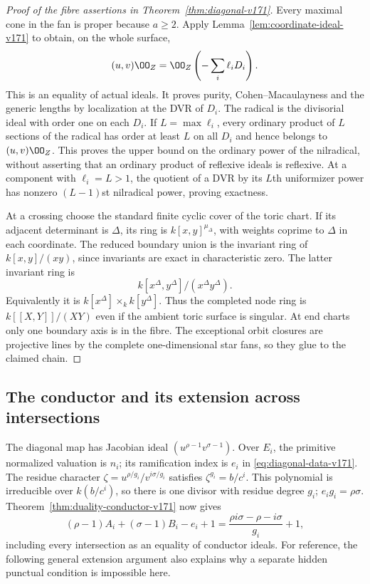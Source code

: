 \begin{proof}[Proof of the fibre assertions in Theorem~\ref{thm:diagonal-v171}]
Every maximal cone in the fan is proper because $a\geq2$. Apply
Lemma~\ref{lem:coordinate-ideal-v171} to obtain, on the whole surface,
\[
 (u,v)\OO_Z=\OO_Z\left(-\sum_i\ell_iD_i\right).
\]
This is an equality of actual ideals. It proves purity,
Cohen--Macaulayness and the generic lengths by localization at the
DVR of $D_i$. The radical is the divisorial ideal with order one
on each $D_i$. If $L=\max\ell_i$, every ordinary product of $L$
sections of the radical has order at least $L$ on all $D_i$ and
hence belongs to $(u,v)\OO_Z$. This proves the upper bound on the
ordinary power of the nilradical, without asserting that an ordinary
product of reflexive ideals is reflexive. At a component with
$\ell_i=L>1$, the quotient of a DVR by its $L$th uniformizer power
has nonzero $(L-1)$st nilradical power, proving exactness.

At a crossing choose the standard finite cyclic cover of the toric
chart. If its adjacent determinant is $\Delta$, its ring is
$k[x,y]^{\mu_\Delta}$, with weights coprime to $\Delta$ in each
coordinate. The reduced boundary union is the invariant ring of
$k[x,y]/(xy)$, since invariants are exact in characteristic zero.
The latter invariant ring is
\[
 k[x^\Delta,y^\Delta]/(x^\Delta y^\Delta).
\]
Equivalently it is $k[x^\Delta]\times_k k[y^\Delta]$. Thus the
completed node ring is $k[[X,Y]]/(XY)$ even if the ambient toric
surface is singular. At end charts only one boundary axis is in the
fibre. The exceptional orbit closures are projective lines by the
complete one-dimensional star fans, so they glue to the claimed chain.
\end{proof}

\subsection{The conductor and its extension across intersections}
The diagonal map has Jacobian ideal
$(u^{\rho-1}v^{\sigma-1})$. Over $E_i$, the primitive normalized
valuation is $n_i$; its ramification index is $e_i$ in
\eqref{eq:diagonal-data-v171}. The residue character
$\zeta=u^{\rho/g_i}/v^{i\sigma/g_i}$ satisfies
$\zeta^{g_i}=b/c^i$. This polynomial is irreducible over
$k(b/c^i)$, so there is one divisor with residue degree $g_i$;
$e_i g_i=\rho\sigma$. Theorem~\ref{thm:duality-conductor-v171}
now gives
\[
 (\rho-1)A_i+(\sigma-1)B_i-e_i+1
 =\frac{\rho i\sigma-\rho-i\sigma}{g_i}+1,
\]
including every intersection as an equality of conductor ideals.
For reference, the following general extension argument also explains
why a separate hidden punctual condition is impossible here.

